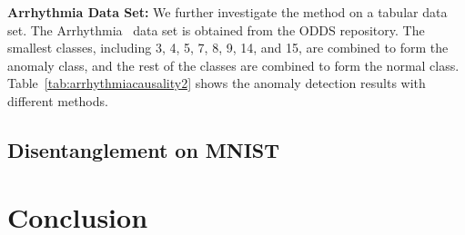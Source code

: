 \documentclass{article} %
\begin{document}



%
%


  
\textbf{Arrhythmia Data Set: }
We further investigate the method on a tabular data set.  The Arrhythmia~\citep{Dua:2019}  data set is  obtained from the ODDS repository. The smallest classes, including 3, 4, 5, 7, 8, 9, 14, and 15, are combined to form the anomaly class, and the rest of the classes are combined to form the normal class. Table~\ref{tab:arrhythmiacausality2} shows the anomaly detection results with different methods. 


\subsection{Disentanglement on MNIST}


\section{Conclusion}\label{sec:conclusion}
\end{document}
